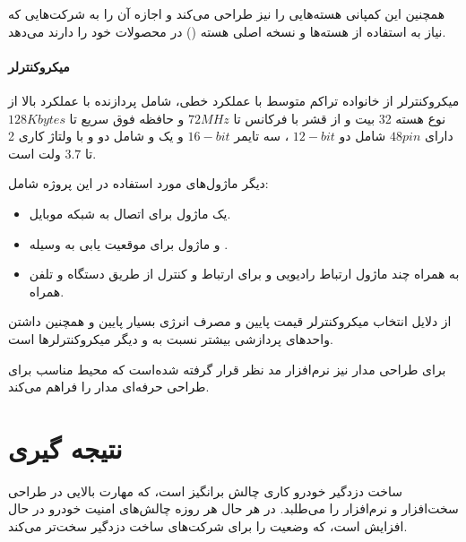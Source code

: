 \documentclass[a4paper,12pt]{report}
\begin{document}
	همچنین این کمپانی هسته‌هایی را نیز طراحی می‌کند و اجازه آن را به شرکت‌هایی که نیاز به استفاده از
	هسته‌ها و  نسخه اصلی هسته
	()
	 در محصولات خود را دارند می‌دهد.

	\subsubsection{
		میکروکنترلر
		}
	میکروکنترلر
	از خانواده تراکم متوسط با عملکرد خطی، شامل پردازنده
	با عملکرد بالا از نوع هسته 32 بیت و از قشر
	با فرکانس تا
	$ 72 MHz $
	و حافظه فوق سریع تا
	$ 128 Kbytes $
	دارای
	$ 48 pin $
	شامل دو
	$ 12-bit $
	، سه تایمر
	$ 16-bit $
	و یک
	و شامل دو
	و
	با ولتاژ کاری 2 تا $ 3.7 $ ولت است.
	\cite{ltc3600:datasheet}

	دیگر ماژول‌های مورد استفاده در این پروژه شامل:
	\begin{itemize}[nosep]\label{item2:sec5:chap1}
		\item
		یک ماژول
		برای اتصال به شبکه موبایل.
		\item
		و ماژول
		برای موقعیت یابی به وسیله
		.
		\item
		به همراه چند ماژول ارتباط رادیویی و
		برای ارتباط و کنترل از طریق دستگاه
		و تلفن همراه.
	\end{itemize}

	از دلایل انتخاب میکروکنترلر
	قیمت پایین و مصرف انرژی بسیار پایین و همچنین داشتن واحد‌های پردازشی بیشتر نسبت به
	و دیگر میکروکنترلرها است.

	برای طراحی مدار نیز نرم‌افزار
	مد نظر قرار گرفته شده‌است که محیط مناسب برای طراحی حرفه‌ای مدار را فراهم می‌کند.
	\pagebreak
	

	\pagebreak
	

	\pagebreak
	

	\pagebreak
	

	\pagebreak
	

	\chapter*{نتیجه گیری}\label{result:chap0}

	ساخت دزدگیر خودرو کاری چالش برانگیز است، که مهارت بالایی در طراحی سخت‌افزار و نرم‌افزار را می‌طلبد.
	در هر حال هر روزه چالش‌های امنیت خودرو در حال افزایش است، که وضعیت را برای شرکت‌های ساخت دزدگیر سخت‌تر می‌کند.
\end{document}
